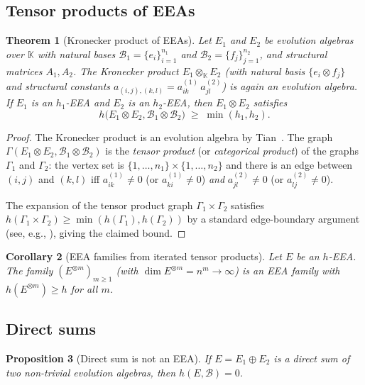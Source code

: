 \documentclass[12pt,a4paper]{amsart}
\newtheorem{theorem}{Theorem}[section]
\newtheorem{proposition}[theorem]{Proposition}
\newtheorem{corollary}[theorem]{Corollary}
\theoremstyle{definition}
\newcommand{\K}{\mathbb{K}}
\newcommand{\hh}{h}          %
\newcommand{\EA}{E}          %
\newcommand{\natbasis}{\mathcal{B}}  %
\newcommand{\strmat}{A}      %
\begin{document}
\subsection{Tensor products of EEAs}\label{sec:tensor}

\begin{theorem}[Kronecker product of EEAs]\label{thm:kronecker}
Let $\EA_1$ and $\EA_2$ be evolution algebras over $\K$ with natural
bases $\natbasis_1=\{e_i\}_{i=1}^{n_1}$ and
$\natbasis_2=\{f_j\}_{j=1}^{n_2}$, and structural matrices
$\strmat_1,\strmat_2$.  The Kronecker product $\EA_1\otimes_\K\EA_2$
(with natural basis $\{e_i\otimes f_j\}$ and structural constants
$a_{(i,j),(k,l)}=a^{(1)}_{ik}\,a^{(2)}_{jl}$) is again an evolution
algebra.  If $\EA_1$ is an $h_1$-EEA and $\EA_2$ is an $h_2$-EEA,
then $\EA_1\otimes\EA_2$ satisfies
\[
  \hh\!\bigl(\EA_1\otimes\EA_2,\natbasis_1\otimes\natbasis_2\bigr)
  \;\ge\;
  \min(h_1,h_2).
\]
\end{theorem}

\begin{proof}
The Kronecker product is an evolution algebra by
Tian~\cite[Corollary~1(5)]{Tian2008}.  The graph
$\varGamma(\EA_1\otimes\EA_2,\natbasis_1\otimes\natbasis_2)$ is the
\emph{tensor product} (or \emph{categorical product}) of the graphs
$\varGamma_1$ and $\varGamma_2$: the vertex set is
$\{1,\ldots,n_1\}\times\{1,\ldots,n_2\}$ and there is an edge between
$(i,j)$ and $(k,l)$ iff $a^{(1)}_{ik}\ne 0$ (or $a^{(1)}_{ki}\ne 0$)
\emph{and} $a^{(2)}_{jl}\ne 0$ (or $a^{(2)}_{lj}\ne 0$).

The expansion of the tensor product graph $\varGamma_1\times\varGamma_2$
satisfies $\hh(\varGamma_1\times\varGamma_2)\ge\min(\hh(\varGamma_1),
\hh(\varGamma_2))$ by a standard edge-boundary argument (see, e.g.,
\cite[Exercise~3.1.13]{Kowalski2019}), giving the claimed bound.
\end{proof}

\begin{corollary}[EEA families from iterated tensor products]
\label{cor:tensor-family}
Let $\EA$ be an $h$-EEA.  The family $(\EA^{\otimes m})_{m\ge 1}$
(with $\dim\EA^{\otimes m}=n^m\to\infty$) is an EEA family with
$\hh(\EA^{\otimes m})\ge h$ for all $m$.
\end{corollary}

\subsection{Direct sums}

\begin{proposition}[Direct sum is not an EEA]
If $\EA=\EA_1\oplus\EA_2$ is a direct sum of two non-trivial evolution
algebras, then $\hh(\EA,\natbasis)=0$.
\end{proposition}
\end{document}
